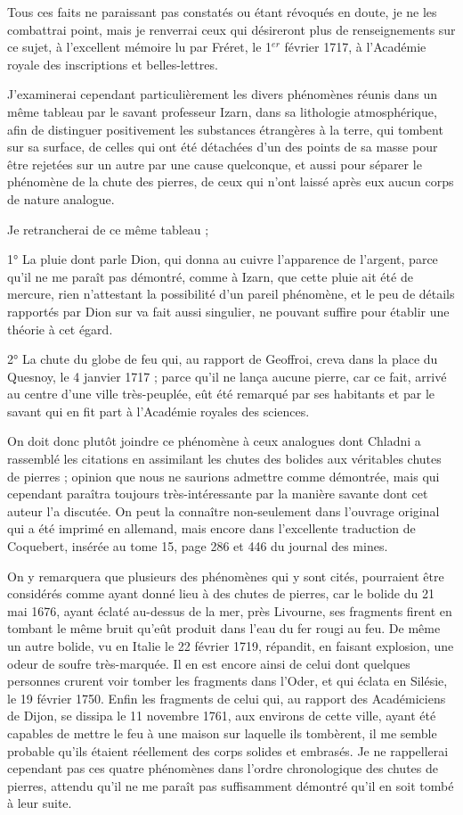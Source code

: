 \documentclass[a4paper, 12pt, oneside, french]{article}
\begin{document}
Tous ces faits ne paraissant pas constatés ou étant révoqués en doute, je ne les combattrai point, mais je renverrai ceux qui désireront plus de renseignements sur ce sujet, à l'excellent mémoire lu par Fréret, le 1$^{er}$ février 1717, à l'Académie royale des inscriptions et belles-lettres.

J'examinerai cependant particulièrement les divers phénomènes réunis dans un même tableau par le savant professeur Izarn, dans sa lithologie atmosphérique, afin de distinguer positivement les substances étrangères à la terre, qui tombent sur sa surface, de celles qui ont été détachées d'un des points de sa masse pour être rejetées sur un autre par une cause quelconque, et aussi pour séparer le phénomène de la chute des pierres, de ceux qui n'ont laissé après eux aucun corps de nature analogue.

Je retrancherai de ce même tableau ;

1° La pluie dont parle Dion, qui donna au cuivre l'apparence de l'argent, parce qu'il ne me paraît pas démontré, comme à Izarn, que cette pluie ait été de mercure, rien n'attestant la possibilité d'un pareil phénomène, et le peu de détails rapportés par Dion sur va fait aussi singulier, ne pouvant suffire pour établir une théorie à cet égard.

2° La chute du globe de feu qui, au rapport de Geoffroi, creva dans la place du Quesnoy, le 4 janvier 1717 ; parce qu'il ne lança aucune pierre, car ce fait, arrivé au centre d'une ville très-peuplée, eût été remarqué par ses habitants et par le savant qui en fit part à l'Académie royales des sciences.

On doit donc plutôt joindre ce phénomène à ceux analogues dont Chladni a rassemblé les citations en assimilant les chutes des bolides aux véritables chutes de pierres ; opinion que nous ne saurions admettre comme démontrée, mais qui cependant paraîtra toujours très-intéressante par la manière savante dont cet auteur l'a discutée. On peut la connaître non-seulement dans l'ouvrage original qui a été imprimé en allemand, mais encore dans l'excellente traduction de Coquebert, insérée au tome 15, page 286 et 446 du journal des mines.

On y remarquera que plusieurs des phénomènes qui y sont cités, pourraient être considérés comme ayant donné lieu à des chutes de pierres, car le bolide du 21 mai 1676, ayant éclaté au-dessus de la mer, près Livourne, ses fragments firent en tombant le même bruit qu'eût produit dans l'eau du fer rougi au feu. De même un autre bolide, vu en Italie le 22 février 1719, répandit, en faisant explosion, une odeur de soufre très-marquée. Il en est encore ainsi de celui dont quelques personnes crurent voir tomber les fragments dans l'Oder, et qui éclata en Silésie, le 19 février 1750. Enfin les fragments de celui qui, au rapport des Académiciens de Dijon, se dissipa le 11 novembre 1761, aux environs de cette ville, ayant été capables de mettre le feu à une maison sur laquelle ils tombèrent, il me semble probable qu'ils étaient réellement des corps solides et embrasés. Je ne rappellerai cependant pas ces quatre phénomènes dans l'ordre chronologique des chutes de pierres, attendu qu'il ne me paraît pas suffisamment démontré qu'il en soit tombé à leur suite.
\end{document}
